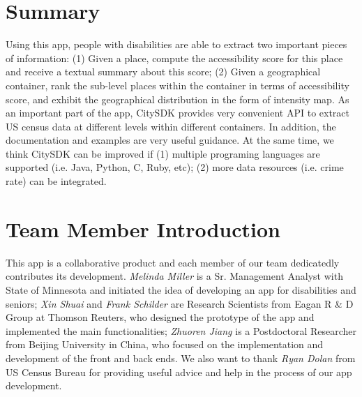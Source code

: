 \documentclass[10pt]{article}
\begin{document}
 \section{Summary}
 Using this app, people with disabilities are able to extract two important pieces of information: (1) Given a place, compute the accessibility score for this place and receive a textual summary about this score; (2) Given a geographical container, rank the sub-level places within the container in terms of accessibility score, and exhibit the geographical distribution in the form of intensity map. As an important part of the app, CitySDK provides very convenient API to extract US census data at different levels within different containers. In addition, the documentation and examples are very useful guidance. At the same time, we think CitySDK can be improved if (1) multiple programing languages are supported (i.e. Java, Python, C, Ruby, etc); (2) more data resources (i.e. crime rate) can be integrated. 

\section*{Team Member Introduction}
This app is a collaborative product and each member of our team dedicatedly contributes its development. \emph{Melinda Miller} is a Sr. Management Analyst with State of Minnesota and initiated the idea of developing an app for disabilities and seniors; \emph{Xin Shuai} and \emph{Frank Schilder} are Research Scientists from Eagan R \& D Group at Thomson Reuters, who designed the prototype of the app and implemented the main functionalities; \emph{Zhuoren Jiang} is a Postdoctoral Researcher from Beijing University in China, who focused on the implementation and development of the front and back ends. We also want to thank \emph{Ryan Dolan} from US Census Bureau for providing useful advice and help in the process of our app development.
%
%
%




%
%
\end{document}
